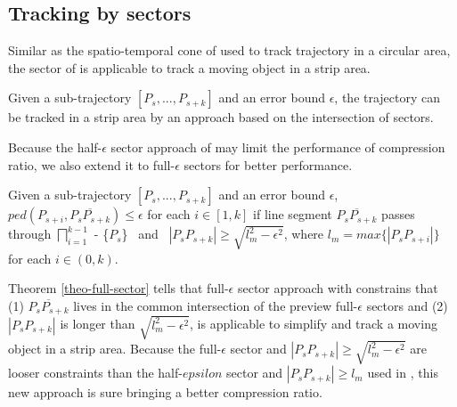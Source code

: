 \subsection{Tracking by sectors}

Similar as the spatio-temporal cone of \sed used to track trajectory in a circular area, the sector of \ped is applicable to track a moving object in a strip area. 



\begin{theorem}
	\label{theo-half-sector}
	Given a sub-trajectory $[P_s,...,P_{s+k}]$ and an error bound $\epsilon$, the trajectory can be tracked in a strip area by an approach based on the intersection of sectors.
\end{theorem}

Because the half-$\epsilon$ sector approach of \cite{Williams:Longest, Sklansky:Cone,Zhao:Sleeve} may limit the performance of compression ratio, we also extend it to full-$\epsilon$ sectors for better performance.

\begin{theorem}
	\label{theo-full-sector}
	Given a sub-trajectory $[P_s,...,P_{s+k}]$ and an error bound $\epsilon$, $ped(P_{s+i}, \overline{P_sP_{s+k}})\le \epsilon$ for each $i \in [1,k]$ if line segment $\overline{P_sP_{s+k}}$ passes through $\bigsqcap_{i=1}^{k-1}$ - \{$P_s$\} ~and~ $|P_sP_{s+k}| \ge \sqrt{l_{m}^2 - \epsilon^2}$, where $l_{m} = max\{|P_sP_{s+i}|\}$ for each $i \in (0, k)$.
\end{theorem}

Theorem \ref{theo-full-sector} tells that full-$\epsilon$ sector approach with constrains that (1) $\overline{P_sP_{s+k}}$ lives in the common intersection of the preview full-$\epsilon$ sectors and (2) $|P_sP_{s+k}|$ is longer than $\sqrt{l_{m}^2 -\epsilon^2}$, is applicable to simplify and track a moving object in a strip area. Because the full-$\epsilon$ sector and $|P_sP_{s+k}| \ge \sqrt{l_{m}^2 - \epsilon^2}$ are looser constraints than the half-$epsilon$ sector and $|P_sP_{s+k}| \ge l_{m}$ used in \cite{Williams:Longest, Sklansky:Cone,Zhao:Sleeve}, this new approach is sure bringing a better compression ratio.



